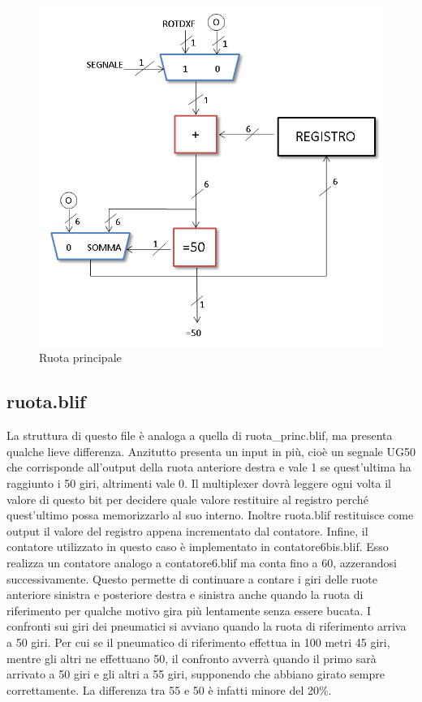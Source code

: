 \documentclass[a4paper,titlepage]{book}
\begin{document}
\begin{figure}[!hb]
\centering
\includegraphics[scale=0.5]{schemi/ruota_principale.png}
\caption{Ruota principale}
\end{figure}



\subsection{ruota.blif}

La struttura di questo file è analoga a quella di ruota\_princ.blif, ma presenta qualche lieve  differenza.  Anzitutto presenta un input in più, cioè un segnale UG50 che corrisponde all'output della  ruota anteriore destra e vale 1 se quest'ultima ha raggiunto i 50 giri, altrimenti vale 0. Il  multiplexer dovrà leggere ogni volta il valore di questo bit per decidere quale valore  restituire al registro perché quest'ultimo possa memorizzarlo al suo interno.  Inoltre ruota.blif restituisce come output il valore del registro appena incrementato dal  contatore.  Infine, il contatore utilizzato in questo caso è implementato in contatore6bis.blif. Esso  realizza un contatore analogo a contatore6.blif ma conta fino a 60, azzerandosi  successivamente. Questo permette di continuare a contare i giri delle ruote anteriore  sinistra e posteriore destra e sinistra anche quando la ruota di riferimento per qualche  motivo gira più lentamente senza essere bucata. I confronti sui giri dei pneumatici si  avviano quando la ruota di riferimento arriva a 50 giri. Per cui se il pneumatico di  riferimento effettua in 100 metri 45 giri, mentre gli altri ne effettuano 50, il confronto  avverrà quando il primo sarà arrivato a 50 giri e gli altri a 55 giri, supponendo che abbiano  girato sempre correttamente. La differenza tra 55 e 50 è infatti minore del 20\%.  
\end{document}
